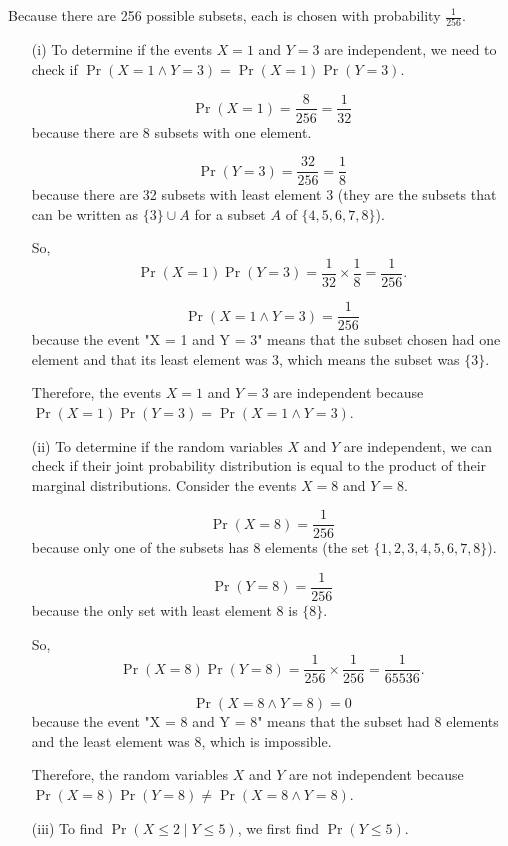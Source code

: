 \begin{solution}
Because there are 256 possible subsets, each is chosen with probability $\frac{1}{256}$.

\begin{enumerate}
    \item[(i)] To determine if the events $X = 1$ and $Y = 3$ are independent, we need to check if $\Pr(X = 1 \land Y = 3) = \Pr(X = 1) \Pr(Y = 3)$.
    
    \[
    \Pr(X = 1) = \frac{8}{256} = \frac{1}{32}
    \]
    because there are 8 subsets with one element.
    
    \[
    \Pr(Y = 3) = \frac{32}{256} = \frac{1}{8}
    \]
    because there are 32 subsets with least element 3 (they are the subsets that can be written as $\{3\} \cup A$ for a subset $A$ of $\{4,5,6,7,8\}$).

    So,
    \[
    \Pr(X = 1)\Pr(Y = 3) = \frac{1}{32} \times \frac{1}{8} = \frac{1}{256}.
    \]

    \[
    \Pr(X = 1 \land Y = 3) = \frac{1}{256}
    \]
    because the event "X = 1 and Y = 3" means that the subset chosen had one element and that its least element was 3, which means the subset was $\{3\}$.

    Therefore, the events $X = 1$ and $Y = 3$ are independent because $\Pr(X = 1) \Pr(Y = 3) = \Pr(X = 1 \land Y = 3)$.

    \item[(ii)] To determine if the random variables $X$ and $Y$ are independent, we can check if their joint probability distribution is equal to the product of their marginal distributions. Consider the events $X = 8$ and $Y = 8$.

    \[
    \Pr(X = 8) = \frac{1}{256}
    \]
    because only one of the subsets has 8 elements (the set $\{1,2,3,4,5,6,7,8\}$).

    \[
    \Pr(Y = 8) = \frac{1}{256}
    \]
    because the only set with least element 8 is $\{8\}$.

    So,
    \[
    \Pr(X = 8) \Pr(Y = 8) = \frac{1}{256} \times \frac{1}{256} = \frac{1}{65536}.
    \]

    \[
    \Pr(X = 8 \land Y = 8) = 0
    \]
    because the event "X = 8 and Y = 8" means that the subset had 8 elements and the least element was 8, which is impossible.

    Therefore, the random variables $X$ and $Y$ are not independent because $\Pr(X = 8) \Pr(Y = 8) \neq \Pr(X = 8 \land Y = 8)$.

    \item[(iii)] To find $\Pr(X \leq 2 \mid Y \leq 5)$, we first find $\Pr(Y \leq 5)$.


\end{enumerate}
\end{solution}
